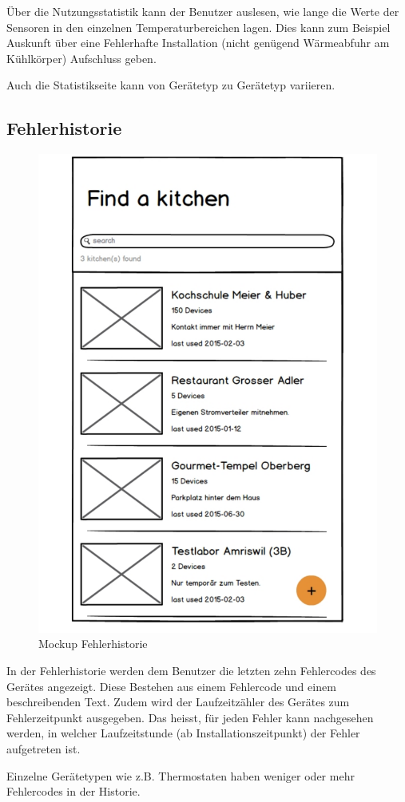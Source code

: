 Über die Nutzungsstatistik kann der Benutzer auslesen, wie lange die Werte der Sensoren in den einzelnen Temperaturbereichen lagen. Dies kann zum Beispiel Auskunft über eine Fehlerhafte Installation (nicht genügend Wärmeabfuhr am Kühlkörper) Aufschluss geben.

Auch die Statistikseite kann von Gerätetyp zu Gerätetyp variieren.

\WFclear
\vspace{2cm}

\subsection{Fehlerhistorie}
\label{subsec:Fehlerhistorie}

\begin{figure}
	\begin{center}
		\includegraphics[page=8,trim=0 0 0 0,clip,scale=0.21]{uiux/res/mockups}
		\caption{Mockup Fehlerhistorie}
		\label{abb:mockDeviceErrors}
	\end{center}
\end{figure}

In der Fehlerhistorie werden dem Benutzer die letzten zehn Fehlercodes des Gerätes angezeigt. Diese Bestehen aus einem Fehlercode und einem beschreibenden Text. Zudem wird der Laufzeitzähler des Gerätes zum Fehlerzeitpunkt ausgegeben. Das heisst, für jeden Fehler kann nachgesehen werden, in welcher Laufzeitstunde (ab Installationszeitpunkt) der Fehler aufgetreten ist.

Einzelne Gerätetypen wie z.B. Thermostaten haben weniger oder mehr Fehlercodes in der Historie.